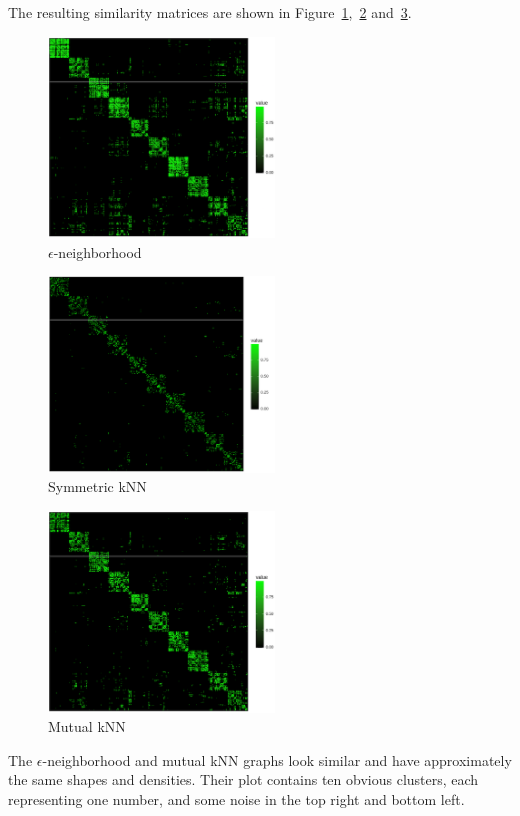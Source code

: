 \documentclass{support/acm_proc_article-sp}
\begin{document}
    The resulting similarity matrices are shown in
    Figure~\ref{fig:2b-e-neighbors},~\ref{fig:2b-symmetric-knn} and~\ref{fig:2b-mutual-knn}.
    \begin{figure}[htbp]
        \centering
        \includegraphics[width=6cm]{images/2b-e-neighbors.png}
        \caption{$\epsilon$-neighborhood}
        \label{fig:2b-e-neighbors}
    \end{figure}
    \begin{figure}[htbp]
        \centering
        \includegraphics[width=6cm]{images/2b-symmetric-knn.png}
        \caption{Symmetric kNN}
        \label{fig:2b-symmetric-knn}
    \end{figure}
    \begin{figure}[htbp]
        \centering
        \includegraphics[width=6cm]{images/2b-mutual-knn.png}
        \caption{Mutual kNN}
        \label{fig:2b-mutual-knn}
    \end{figure}
    The $\epsilon$-neighborhood and mutual kNN graphs look similar and have approximately the same shapes and
    densities.
    Their plot contains ten obvious clusters, each representing one number, and some noise in the top right and
    bottom left.
\end{document}

